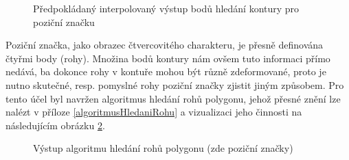\begin{figure}[H]
  \begin{center}
    \caption{Předpokládaný interpolovaný výstup bodů hledání kontury pro
    poziční značku}
    \label{FinderMarkContourDetection}
  \end{center}
\end{figure}

Poziční značka, jako obrazec čtvercovitého charakteru, je přesně definována
čtyřmi body (rohy). Množina bodů kontury nám ovšem tuto informaci přímo nedává,
ba dokonce rohy v kontuře mohou být různě zdeformované, proto je nutno skutečné,
resp. pomyslné rohy poziční značky zjistit jiným způsobem. Pro tento účel byl
navržen algoritmus hledání rohů polygonu, jehož přesné znění lze nalézt v
příloze \ref{algoritmusHledaniRohu} a vizualizaci jeho činnosti na následujícím
obrázku \ref{SearchCornersOfPolygonAlgorithm}.

\begin{figure}[H]
  \begin{center}
    \caption{Výstup algoritmu hledání rohů polygonu (zde poziční značky)}
    \label{SearchCornersOfPolygonAlgorithm}
  \end{center}
\end{figure}

